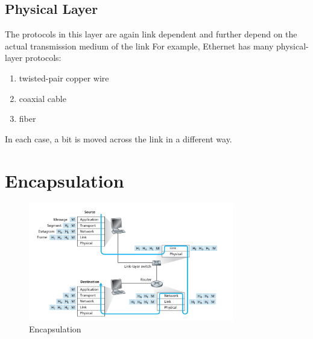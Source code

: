 \subsection{Physical Layer}
The protocols in this layer are
again link dependent and further depend on the actual transmission medium of the
link
For example,
Ethernet has many physical-layer protocols:
\begin{enumerate}
    \item twisted-pair copper wire
    \item coaxial cable
    \item fiber
\end{enumerate}
In each case, a bit is moved
across the link in a different way.


\section{Encapsulation}

\begin{figure}[!h]
    \centering
    \includegraphics[width=0.8\textwidth]{chapters/chapter1/Encapsulation.png}
    \caption{Encapsulation}
    \label{c1_encapsulation}
\end{figure}